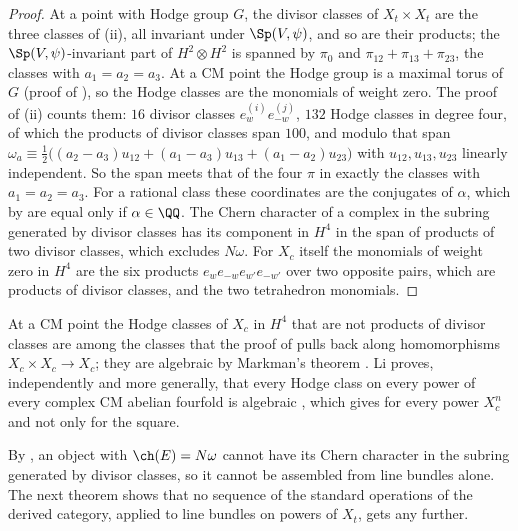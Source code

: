 \begin{proof}
At a point with Hodge group $G$, the divisor classes of $X_{t}\times X_{t}$ are
the three classes of (ii), all invariant under
$\Sp(V,\psi)$, and so are their products; the $\Sp(V,\psi)$-invariant part of
$H^{2}\otimes H^{2}$ is spanned by $\pi_{0}$ and $\pi_{12}+\pi_{13}+\pi_{23}$,
the classes with $a_{1}=a_{2}=a_{3}$. At a CM point the Hodge group is a
maximal torus of $G$ (proof of ), so the Hodge classes
are the monomials of weight zero. The proof of (ii)
counts them: $16$ divisor classes $e^{(i)}_{w}e^{(j)}_{-w}$, $132$ Hodge
classes in degree four, of which the products of divisor classes span $100$,
and modulo that span
$\omega_{a}\equiv\frac12\bigl((a_{2}-a_{3})u_{12}+(a_{1}-a_{3})u_{13}
+(a_{1}-a_{2})u_{23}\bigr)$ with $u_{12},u_{13},u_{23}$ linearly independent.
So the span meets that of the four $\pi$ in exactly the classes with
$a_{1}=a_{2}=a_{3}$. For a rational class these
coordinates are the conjugates of $\alpha$, which by  are
equal only if $\alpha\in\QQ$. The Chern character of a complex in the subring
generated by divisor classes has its component in $H^{4}$ in the span of
products of two divisor classes, which excludes $N\omega$. For $X_{c}$ itself
the monomials of weight zero in $H^{4}$ are the six products
$e_{w}e_{-w}e_{w'}e_{-w'}$ over two opposite pairs, which are products of
divisor classes, and the two tetrahedron monomials.
\end{proof}

At a CM point the Hodge classes of $X_{c}$ in $H^{4}$ that are not products
of divisor classes are among the classes that the proof of
 pulls back along homomorphisms $X_{c}\times X_{c}\to
X_{c}$; they are algebraic by Markman's theorem \cite{Mar25a}. Li proves,
independently and more generally, that every Hodge class on every power of
every complex CM abelian fourfold is algebraic \cite[Theorem~1.3]{Li26}, which
gives  for every power $X_{c}^{n}$ and not only for the
square.

By , an object with $\ch(E)=N\omega$ cannot have
its Chern character in the subring generated by divisor classes, so it cannot
be assembled from line bundles alone. The next theorem shows that no sequence
of the standard operations of the derived category, applied to line bundles
on powers of $X_{t}$, gets any further.

